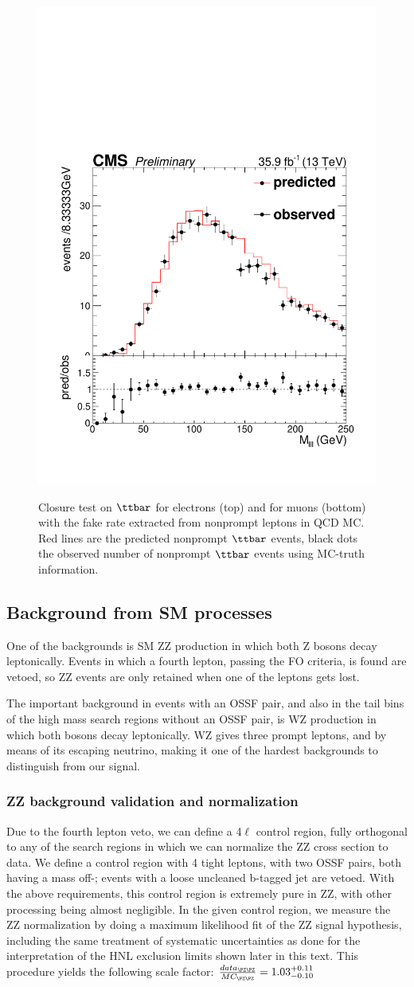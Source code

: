 \begin{figure}[h]
{\includegraphics[width=.22\textwidth]{Figures/c5/FAKE/mu_closuresMlll.pdf}}
\caption{Closure test on $\ttbar$ for electrons (top) and for muons
  (bottom) with the fake rate extracted from nonprompt leptons in QCD MC. Red lines are the predicted nonprompt $\ttbar$ events, black dots the observed number of nonprompt $\ttbar$ events using MC-truth information.}
\label{fig:closures2_ele}
\end{figure}

\subsection{Background from SM processes}
One of the backgrounds is SM ZZ production in which both Z bosons
decay leptonically. Events in which a fourth lepton, passing the FO
criteria, is found are vetoed, so ZZ events are only retained when one
of the leptons gets lost.

The important background in events with an OSSF pair, and also in
the tail bins of the high mass search regions without an OSSF pair, is
WZ production in which both bosons decay leptonically. WZ gives three
prompt leptons, and \met  by means of its escaping neutrino, making it
one of the hardest backgrounds to distinguish from our signal.
\subsubsection{ZZ background validation and normalization}
Due to the fourth lepton veto, we can define a 4$\ell$ control region,
fully orthogonal to any of the search regions in which we can
normalize the ZZ cross section to data. We define a control region
with 4 tight leptons, with two OSSF pairs, both having a mass off-\PZ;
events with a loose uncleaned b-tagged jet are vetoed. With the above requirements, this control region is extremely pure in ZZ, with other processing being almost negligible.
In the given control region, we measure the ZZ normalization by doing a maximum likelihood fit of the ZZ signal hypothesis, including the same treatment of systematic uncertainties as done for the interpretation of the HNL exclusion limits shown later in this text. This procedure yields the following scale factor:
$\frac{data_{\PZ\PZ}}{MC_{\PZ\PZ}} = 1.03_{-0.10}^{+0.11}$


